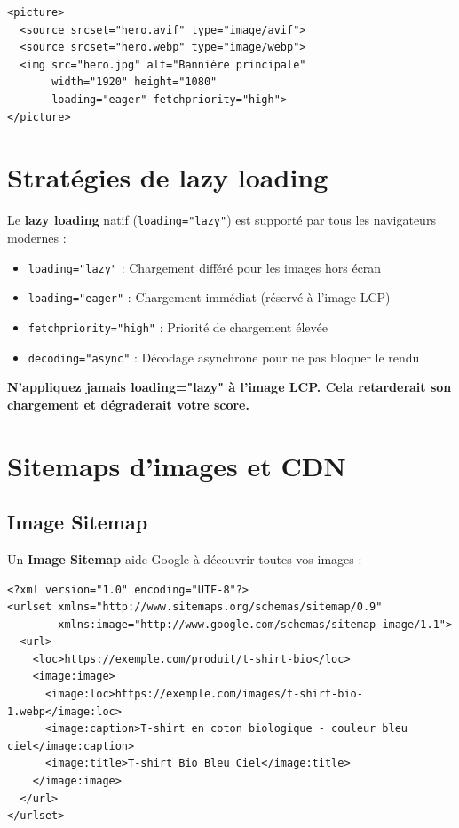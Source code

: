 \documentclass[12pt,a4paper,twoside]{report}
\newcommand{\keyword}[1]{\textbf{\textcolor{googleblue}{#1}}}
\newcommand{\important}[1]{\textbf{\textcolor{googlered}{#1}}}
\begin{document}
\begin{lstlisting}[style=htmlcode,caption={Balise picture avec fallback et formats multiples}]
<picture>
  <source srcset="hero.avif" type="image/avif">
  <source srcset="hero.webp" type="image/webp">
  <img src="hero.jpg" alt="Bannière principale"
       width="1920" height="1080"
       loading="eager" fetchpriority="high">
</picture>
\end{lstlisting}

\section{Stratégies de lazy loading}

Le \keyword{lazy loading} natif (\texttt{loading="lazy"}) est supporté par tous les navigateurs modernes :

\begin{itemize}
    \item \texttt{loading="lazy"} : Chargement différé pour les images hors écran
    \item \texttt{loading="eager"} : Chargement immédiat (réservé à l'image LCP)
    \item \texttt{fetchpriority="high"} : Priorité de chargement élevée
    \item \texttt{decoding="async"} : Décodage asynchrone pour ne pas bloquer le rendu
\end{itemize}

\important{N'appliquez jamais loading="lazy" à l'image LCP. Cela retarderait son chargement et dégraderait votre score.}

\section{Sitemaps d'images et CDN}

\subsection{Image Sitemap}

Un \keyword{Image Sitemap} aide Google à découvrir toutes vos images :

\begin{lstlisting}[style=htmlcode,caption={Extrait de sitemap d'images}]
<?xml version="1.0" encoding="UTF-8"?>
<urlset xmlns="http://www.sitemaps.org/schemas/sitemap/0.9"
        xmlns:image="http://www.google.com/schemas/sitemap-image/1.1">
  <url>
    <loc>https://exemple.com/produit/t-shirt-bio</loc>
    <image:image>
      <image:loc>https://exemple.com/images/t-shirt-bio-1.webp</image:loc>
      <image:caption>T-shirt en coton biologique - couleur bleu ciel</image:caption>
      <image:title>T-shirt Bio Bleu Ciel</image:title>
    </image:image>
  </url>
</urlset>
\end{lstlisting}
\end{document}

